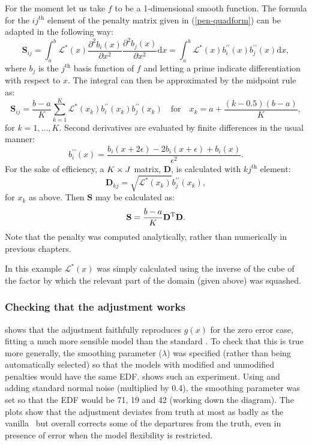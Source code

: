 For the moment let us take $f$ to be a 1-dimensional smooth function. The formula for the $ij^\text{th}$ element of the penalty matrix given in (\ref{pen-quadform}) can be adapted in the following way: 
\begin{equation*}
\mathbf{S}_{ij}= \int_a^b \mathcal{L}^*(x) \frac{\partial^2 b_i(x)}{\partial x^2}\frac{\partial^2 b_j(x)}{\partial x^2} \text{d}x = \int_a^b \mathcal{L}^*(x) b^{\prime\prime}_i(x) b^{\prime\prime}_j(x) \text{d}x,
\end{equation*}
where $b_j$ is the $j^\text{th}$ basis function of $f$ and letting a prime indicate differentiation with respect to $x$. The integral can then be approximated by the midpoint rule as:
\begin{equation}
\mathbf{S}_{ij}= \frac{b-a}{K}\sum_{k=1}^K \mathcal{L}^*(x_k) b^{\prime\prime}_i(x_k) b^{\prime\prime}_j(x_k) \quad \text{for} \quad x_k=a+\frac{(k-0.5)(b-a)}{K},
\label{midpointS}
\end{equation}
for $k=1,\dots, K$. Second derivatives are evaluated by finite differences in the usual manner:
\begin{equation}
\label{bfinitediff}
b^{\prime\prime}_i(x) = \frac{ b_i(x+2\epsilon) - 2b_i(x+\epsilon) + b_i(x)}{\epsilon^2}.
\end{equation}
For the sake of efficiency, a $K\times J$ matrix, $\mathbf{D}$, is calculated with $kj^\text{th}$ element:
\begin{equation}
\mathbf{D}_{kj}=\sqrt{\mathcal{L}^*(x_k)} b^{\prime\prime}_j(x_k),
\label{oneDD}
\end{equation}
for $x_k$ as above. Then $\mathbf{S}$ may be calculated as:
\begin{equation*}
\mathbf{S}=\frac{b-a}{K}\mathbf{D}^{\text{T}}\mathbf{D}.
\end{equation*}
Note that the penalty was computed analytically, rather than numerically in previous chapters.

In this example $\mathcal{L}^*(x)$ was simply calculated using the inverse of the cube of the factor by which the relevant part of the domain (given above) was squashed. 

\subsubsection{Checking that the adjustment works}

 shows that the adjustment faithfully reproduces $g(x)$ for the zero error case, fitting a much more sensible model than the standard \tprs. To check that this is true more generally, the smoothing parameter ($\lambda$) was specified (rather than being automatically selected) so that the models with modified and unmodified penalties would have the same EDF.  shows such an experiment. Using  and adding standard normal noise (multiplied by 0.4), the smoothing parameter was set so that the EDF would be 71, 19 and 42 (working down the diagram). The plots show that the adjustment deviates from truth at most as badly as the vanilla \tprs\ but overall corrects some of the departures from the truth, even in presence of error when the model flexibility is restricted.

